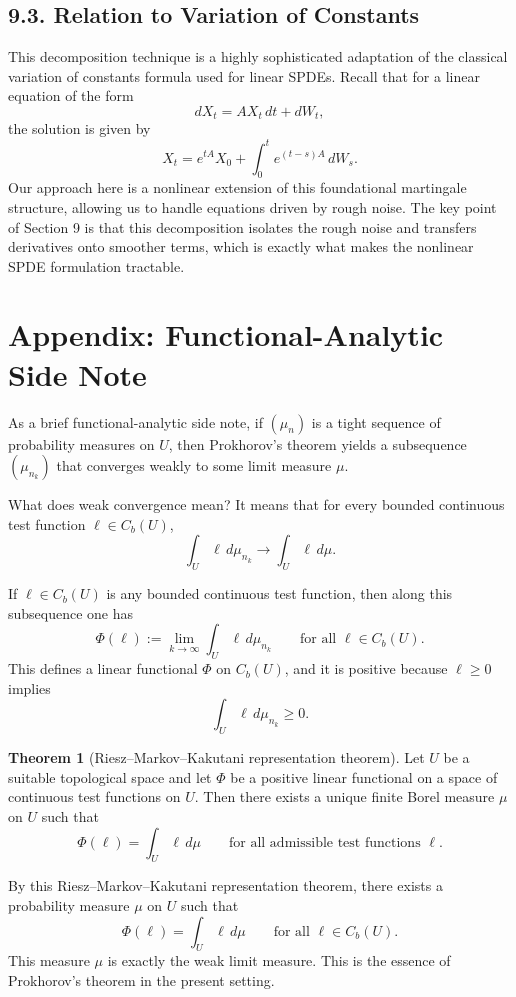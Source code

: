 \documentclass[11pt]{article}
\theoremstyle{definition}
\newtheorem{theorem}{Theorem}
\theoremstyle{remark}
\begin{document}
\subsection*{9.3. Relation to Variation of Constants}
This decomposition technique is a highly sophisticated adaptation of the classical variation of constants formula used for linear SPDEs. Recall that for a linear equation of the form
\[
dX_t=AX_t\,dt+dW_t,
\]
the solution is given by
\[
X_t=e^{tA}X_0+\int_0^t e^{(t-s)A}\,dW_s.
\]
Our approach here is a nonlinear extension of this foundational martingale structure, allowing us to handle equations driven by rough noise.
The key point of Section 9 is that this decomposition isolates the rough noise and transfers derivatives onto smoother terms, which is exactly what makes the nonlinear SPDE formulation tractable.

\section*{Appendix: Functional-Analytic Side Note}
As a brief functional-analytic side note, if $(\mu_n)$ is a tight sequence of probability measures on $U$, then Prokhorov's theorem yields a subsequence $(\mu_{n_k})$ that converges weakly to some limit measure $\mu$.

What does weak convergence mean? It means that for every bounded continuous test function $\ell\in C_b(U)$,
\[
  \int_U \ell\,d\mu_{n_k}\to \int_U \ell\,d\mu.
\]

If $\ell\in C_b(U)$ is any bounded continuous test function, then along this subsequence one has
\[
  \Phi(\ell):=\lim_{k\to\infty}\int_U \ell\,d\mu_{n_k}
  \qquad \text{for all } \ell\in C_b(U).
\]
This defines a linear functional $\Phi$ on $C_b(U)$, and it is positive because $\ell\ge 0$ implies
\[
  \int_U \ell\,d\mu_{n_k}\ge 0.
\]

\begin{theorem}[Riesz--Markov--Kakutani representation theorem]
Let $U$ be a suitable topological space and let $\Phi$ be a positive linear functional on a space of continuous test functions on $U$. Then there exists a unique finite Borel measure $\mu$ on $U$ such that
\[
  \Phi(\ell)=\int_U \ell\,d\mu
  \qquad \text{for all admissible test functions } \ell.
\]
\end{theorem}

By this Riesz--Markov--Kakutani representation theorem, there exists a probability measure $\mu$ on $U$ such that
\[
  \Phi(\ell)=\int_U \ell\,d\mu
  \qquad \text{for all } \ell\in C_b(U).
\]
This measure $\mu$ is exactly the weak limit measure. This is the essence of Prokhorov's theorem in the present setting.
\end{document}
